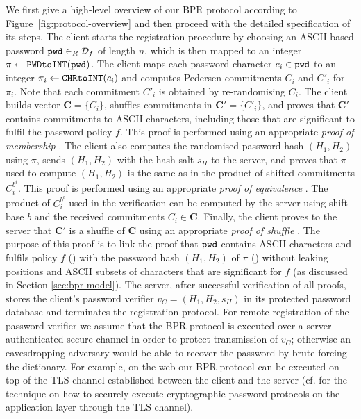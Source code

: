 We first give a high-level overview of our BPR protocol according to Figure~\ref{fig:protocol-overview} and then proceed with the detailed specification of its steps. The client starts the registration procedure by choosing an ASCII-based password $\mathtt{pwd}\in_R\mathcal{D}_f$ of length $n$, which is then mapped to an integer $\pi\gets\texttt{PWDtoINT}(\mathtt{pwd})$.
The client maps each password character $c_i\in\mathtt{pwd}$ to an integer $\pi_i\gets\texttt{CHRtoINT}(c_i)$ and computes Pedersen commitments $C_i$ and $C'_i$ for $\pi_i$. Note that each commitment $C'_i$ is obtained by re-randomising $C_i$. 
The client builds vector $\bm{C}=\{C_i\}$, shuffles commitments in $\bm{C'}=\{C'_i\}$, and proves that $\bm C'$ contains commitments to ASCII characters, including those that are significant to fulfil the password policy $f$. 
This proof is performed using an appropriate \emph{proof of membership} \PoM.
The client also computes the randomised password hash $(H_1, H_2)$ using $\pi$, sends $(H_1, H_2)$ with the hash salt $s_H$ to the server, and proves that $\pi$ used to compute $(H_1, H_2)$ is the same as in the product of shifted commitments $C^{{b^i}}_i$. 
This proof is performed using an appropriate \emph{proof of equivalence} \PoE.
The product of $C^{b^i}_i$ used in the verification can be computed by the server using shift base $b$ and the received commitments $C_i\in \bm C$.
Finally, the client proves to the server that $\bm C'$ is a shuffle of $\bm C$ using an appropriate \emph{proof of shuffle} \PoS. 
The purpose of this proof is to link the proof that $\mathtt{pwd}$ contains ASCII characters and fulfils policy $f$ (\PoM) with the password hash $(H_1, H_2)$ of $\pi$ (\PoE) without leaking positions and ASCII subsets of characters that are significant for $f$ (as discussed in Section \ref{sec:bpr-model}). 
The server, after successful verification of all proofs, stores the client's password verifier $v_C = (H_1,H_2,s_H)$ in its protected password database and terminates the registration protocol. 
For remote registration of the password verifier we assume that the BPR protocol is executed over a server-authenticated secure channel in order to protect transmission of $v_C$; otherwise an eavesdropping adversary would be able to recover the password by brute-forcing the dictionary. 
For example, on the web our BPR protocol can be executed on top of the TLS channel established between the client and the server (cf. \cite{Manulis2014} for the technique on how to securely execute cryptographic password protocols on the application layer through the TLS channel).


